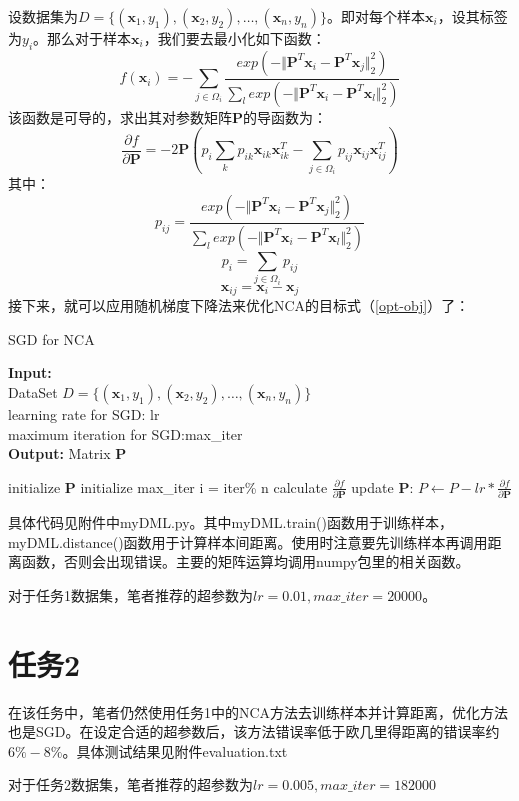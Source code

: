 \documentclass[a4paper,UTF8]{article}
\theoremstyle{definition}
\begin{document}
设数据集为$D=\{(\bm x_1,y_1),(\bm x_2,y_2),\ldots,(\bm x_n,y_n)\}$。即对每个样本$\bm x_i$，设其标签为$y_i$。那么对于样本$\bm x_i$，我们要去最小化如下函数：
\begin{equation}
f(\bm x_i) = - \sum_{j\in\Omega_i}\frac{exp(-\Vert\bm P^T\bm x_i-\bm P^T\bm x_j\Vert_2^2)}{\sum_l exp(-\Vert\bm P^T\bm x_i-\bm P^T\bm x_l\Vert_2^2)}
\end{equation}
该函数是可导的，求出其对参数矩阵$\bm P$的导函数为：
\begin{equation}
\frac{\partial f}{\partial\bm P}=-2\bm P(p_i\sum_k p_{ik}\bm x_{ik}\bm x_{ik}^T-\sum_{j\in\Omega_i}p_{ij}\bm x_{ij}\bm x_{ij}^T)
\end{equation}
其中：
\[
p_{ij}=\frac{exp(-\Vert\bm P^T\bm x_i-\bm P^T\bm x_j\Vert_2^2)}{\sum_l exp(-\Vert\bm P^T\bm x_i-\bm P^T\bm x_l\Vert_2^2)}
\]
\[
p_i=\sum_{j\in\Omega_i}p_{ij}
\]
\[
\bm x_{ij} = \bm x_i-\bm x_j
\]
接下来，就可以应用随机梯度下降法来优化NCA的目标式（\ref{opt-obj}）了：
\begin{algorithm}
\caption{SGD for NCA}
\textbf{Input:}\\ 
DataSet $D=\{(\bm x_1,y_1),(\bm x_2,y_2),\ldots,(\bm x_n,y_n)\}$\\
learning rate for SGD: lr\\
maximum iteration for SGD:max\_iter\\
\textbf{Output:} Matrix $\bm P$

\begin{algorithmic}[1]
\STATE initialize $\bm P$
\STATE initialize max\_iter
\STATE i = iter\% n
\STATE calculate $\frac{\partial f}{\partial\bm P}$
\STATE update $\bm P$: $P\leftarrow P-lr*\frac{\partial f}{\partial\bm P}$
\ENDFOR
\end{algorithmic}
\end{algorithm}

具体代码见附件中myDML.py。其中myDML.train()函数用于训练样本，myDML.distance()函数用于计算样本间距离。使用时注意要先训练样本再调用距离函数，否则会出现错误。主要的矩阵运算均调用numpy包里的相关函数。

对于任务1数据集，笔者推荐的超参数为$lr = 0.01,max\_iter=20000$。

\section*{任务2}
在该任务中，笔者仍然使用任务1中的NCA方法去训练样本并计算距离，优化方法也是SGD。在设定合适的超参数后，该方法错误率低于欧几里得距离的错误率约$6\% - 8\%$。具体测试结果见附件evaluation.txt

对于任务2数据集，笔者推荐的超参数为$lr=0.005,max\_iter=182000$
\end{document}
